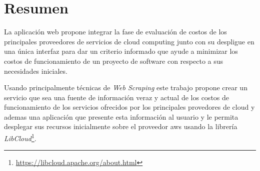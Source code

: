 



\begingroup
\let\clearpage\relax
\let\cleardoublepage\relax
\let\cleardoublepage\relax

\chapter*{Resumen}
La aplicación web \appName propone integrar la fase de evaluación de costos de los principales proveedores de servicios de cloud computing junto con su despligue en una única interfaz para dar un criterio informado que ayude a minimizar los costos de funcionamiento de un proyecto de software con respecto a sus necesidades iniciales.\bigskip

Usando principalmente técnicas de \textit{Web Scraping} este trabajo propone crear un servicio que sea una fuente de información veraz y actual de los costos de funcionamiento de los servicios ofrecidos por los principales provedores de cloud y ademas una aplicación que presente esta información al usuario y le permita desplegar sus recursos inicialmente sobre el proveedor \acs{aws} usando la librería \textit{LibCloud}\footnote{\url{https://libcloud.apache.org/about.html}}.
\endgroup			

\vfill